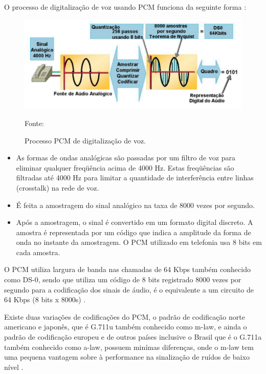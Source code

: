 O processo de digitalização de voz usando PCM funciona da seguinte forma \cite{eduardomaronasmonks2006}:

\begin{figure}[h]
	\centering
	\includegraphics[width=16.0cm]{imagens/processoPCMdigital.jpg}
	\caption{Processo PCM de digitalização de voz.}
    \label{Figura4}
    Fonte: \cite{eduardomaronasmonks2006}
\end{figure}

\begin{itemize}
  \item As formas de ondas analógicas são passadas por um filtro de voz para eliminar qualquer freqüência acima de 4000 Hz. Estas freqüências são filtradas até 4000 Hz para limitar a quantidade de interferência entre linhas (crosstalk) na rede de voz.
  \item É feita a amostragem do sinal analógico na taxa de 8000 vezes por segundo.
  \item Após a amostragem, o sinal é convertido em um formato digital discreto. A amostra é representada por um código que indica a amplitude da forma de onda no instante da amostragem. O PCM utilizado em telefonia usa 8 bits em cada amostra.
\end{itemize}
	
O PCM utiliza largura de banda nas chamadas de 64 Kbps também conhecido como DS-0, sendo que utiliza um código de 8 bits registrado 8000 vezes por segundo para a codificação dos sinais de áudio, é o equivalente a um circuito de 64 Kbps (8 bits x 8000s) \cite{alexandrekeller2014}.

Existe duas variações de codificações do PCM, o padrão de codificação norte americano e japonês, que é G.711u também conhecido como m-law, e ainda o padrão de codificação europeu e de outros países inclusive o Brasil que é o G.711a também conhecido como a-law, possuem minímas diferenças, onde o m-law tem uma pequena vantagem sobre à performance na sinalização de ruídos de baixo nível \cite{gomeslemoscolcher1995}.

